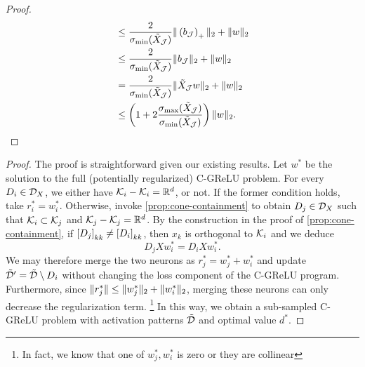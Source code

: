\begin{proof}
\begin{align*}
         & \leq \frac{2}{\sigma_{\text{min}}(\tilde X_{\mathcal{J}})} \|\left(b_{\mathcal{J}}\right)_+\|_2 + \|w\|_2                    \\
         & \leq \frac{2}{\sigma_{\text{min}}(\tilde X_{\mathcal{J}})} \|b_{\mathcal{J}}\|_2 + \|w\|_2                            \\
         & =  \frac{2}{\sigma_{\text{min}}(\tilde X_{\mathcal{J}})} \|\tilde X_{\mathcal{J}} w\|_2 + \|w\|_2                     \\
         & \leq \left(1 + 2\frac{\sigma_{\text{max}}(\tilde X_{\mathcal{J}})}{\sigma_{\text{min}}(\tilde X_{\mathcal{J}})}\right) \|w\|_2.
    \end{align*}
\end{proof}

\approxResult*
\begin{proof}
    The proof is straightforward given our existing results.
    Let \( w^* \) be the solution to the full (potentially regularized) C-GReLU problem.
    For every \( D_i \in \mathcal{D}_{X} \), we either have \( \mathcal{K}_i - \mathcal{K}_i = \mathbb{R}^d \), or not.
    If the former condition holds, take \( r_i^* = w_i^* \).
    Otherwise, invoke \cref{prop:cone-containment} to obtain \( D_j \in \mathcal{D}_{X} \) such that \( \mathcal{K}_i \subset \mathcal{K}_j \) and \( \mathcal{K}_j - \mathcal{K}_j = \mathbb{R}^d \).
    By the construction in the proof of \cref{prop:cone-containment}, if \( \left[D_j\right]_{kk} \neq \left[D_i\right]_{kk} \), then \( x_k \) is orthogonal to \( \mathcal{K}_i \) and we deduce
    \[
        D_j X w^*_i = D_i X w^*_i.
    \]
    We may therefore merge the two neurons as \( r^*_j = w^*_j + w^*_i \) and update 
    \( \tilde {\mathcal{D}}' = \tilde {\mathcal{D}} \setminus D_i \) without changing the 
    loss component of the C-GReLU program.
    Furthermore, since \( \|r^*_j\| \leq \|w^*_j\|_2 + \|w^*_i\|_2 \), 
    merging these neurons can only decrease the regularization term.
    \footnote{In fact, we know that one of \( w^*_j, w^*_i \) is zero or they are collinear}
    In this way, we obtain a sub-sampled C-GReLU problem with activation
    patterns \( \tilde {\mathcal{D}} \) and optimal value \( d^* \).


\end{proof}
